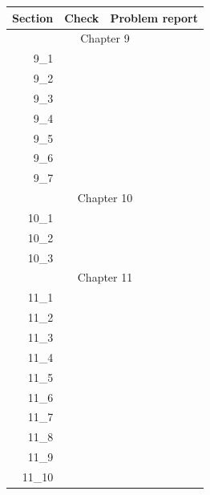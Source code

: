 \begin{tabular}{|r|r|p{8cm}|}
\hline
Section & Check & Problem report \\
\hline
\hline
\multicolumn{3}{|c|}{Chapter 9}\\
\hline
9\_1 & & \\
\hline
9\_2 & & \\
\hline
9\_3 & & \\
\hline
9\_4 & & \\
\hline
9\_5 & & \\
\hline
9\_6 & & \\
\hline
9\_7 & & \\
\hline
\hline
\multicolumn{3}{|c|}{Chapter 10}\\
\hline
10\_1 & & \\
\hline
10\_2 & & \\
\hline
10\_3 & & \\
\hline
\hline
\multicolumn{3}{|c|}{Chapter 11}\\
\hline
11\_1 & & \\
\hline
11\_2 & & \\
\hline
11\_3 & & \\
\hline
11\_4 & & \\
\hline
11\_5 & & \\
\hline
11\_6 & & \\
\hline
11\_7 & & \\
\hline
11\_8 & & \\
\hline
11\_9 & & \\
\hline
11\_10 & & \\
\hline
\hline
\end{tabular}

